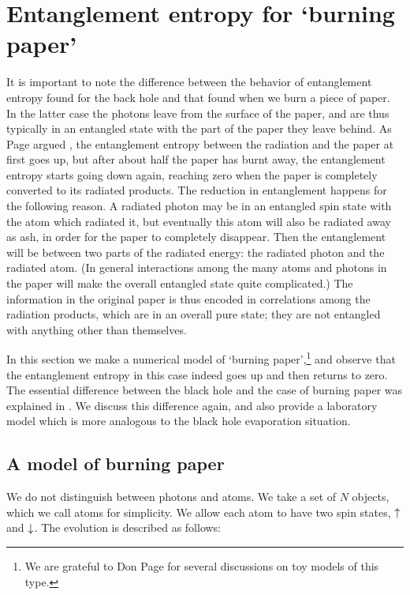 \documentclass[12pt]{article}
\begin{document}
\section{Entanglement entropy for `burning paper'}\label{burn}

It is important to note the difference between the behavior of entanglement entropy found for  the back hole and that found when we burn a piece of paper. In the latter case the photons leave from the surface of the paper, and are thus typically in an entangled state with the 
part of the paper they leave behind. As Page argued \cite{page}, the entanglement entropy between the radiation and the paper at first goes up, but after about half the paper has burnt away, the entanglement entropy starts going down again, reaching zero when the paper is completely converted to its radiated products. The reduction in entanglement happens for the following reason. A radiated photon may be in an entangled spin state with the atom which radiated it, but eventually this atom will also be radiated away as ash, in order for the paper to completely disappear. Then the entanglement will be between two parts of the radiated energy: the radiated photon and the radiated atom. (In general interactions among the many atoms and photons in the paper will make the overall entangled state quite complicated.) The information in the original paper is thus encoded in correlations among the radiation products, which are in an overall pure state; they are not entangled with anything other than themselves.

In this section we make a numerical model of `burning paper',\footnote{We are grateful to Don Page for several discussions on toy models of this type.} and observe that the entanglement entropy in this case indeed goes up and then returns to zero. The essential difference between the black hole and the case of burning paper was explained in \cite{mathurfuzz}. We discuss this difference again, and also provide a laboratory model which is more analogous to the black hole evaporation situation.

\subsection{A model of burning paper}\label{subfour}


We do not distinguish between photons and atoms. We take a set of $N$ objects, which we call atoms for simplicity. We allow each atom to have two spin states, $\uparrow$ and $\downarrow$. The evolution is described as follows:
\end{document}
